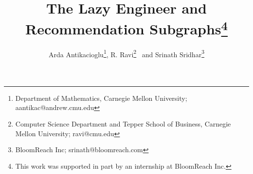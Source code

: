 \documentclass[11pt]{article}
\date{}
\begin{document}
\title{The Lazy Engineer and Recommendation Subgraphs\thanks{This work was supported in part by an internship at BloomReach Inc.}}
\author{Arda Antikacioglu\thanks{Department of Mathematics, Carnegie
    Mellon University; aantikac@andrew.cmu.edu},
R. Ravi\thanks{Computer Science Department and Tepper School of Business, Carnegie Mellon
    University; ravi@cmu.edu}
~and
Srinath Sridhar\thanks{BloomReach Inc; srinath@bloomreach.com}}


\maketitle

\pagebreak

\setcounter{page}{1}








\pagebreak
\setcounter{page}{1}
{}


\pagebreak
\appendix

\end{document}
